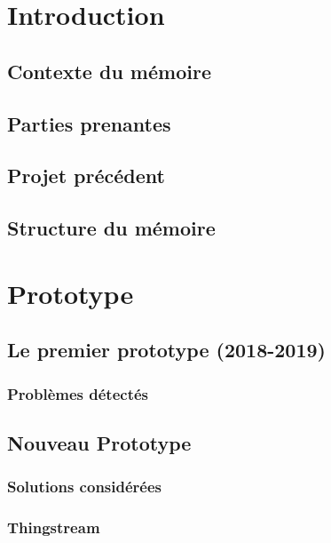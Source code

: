 \chapter{Introduction}

\section{Contexte du mémoire}
\section{Parties prenantes}
\section{Projet précédent}
\section{Structure du mémoire}






\chapter{Prototype}

\section{Le premier prototype (2018-2019)}
\subsection{Problèmes détectés}

\section{Nouveau Prototype}

\subsection{Solutions considérées}
\subsection{Thingstream}
